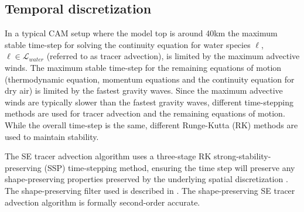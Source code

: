 \documentclass{agujournal}
\begin{document}
{%

\subsection{Temporal discretization}
In a typical CAM setup where the model top is around 40km the maximum stable time-step for solving the continuity equation for water species $\ell$, $\ell \in \mathcal{L}_{water}$ (referred to as tracer advection), is limited by the maximum advective winds. The maximum stable time-step for the remaining equations of motion (thermodynamic equation, momentum equations and the continuity equation for dry air) is limited by the fastest gravity waves.  Since the maximum advective winds are typically slower than the fastest gravity waves, different time-stepping methods are used for tracer advection and the remaining equations of motion. While the overall time-step is the same, different Runge-Kutta (RK) methods are used to maintain stability. 

The SE tracer advection algorithm uses a three-stage RK strong-stability-preserving (SSP) time-stepping method, ensuring the time step will preserve any shape-preserving properties preserved by the underlying spatial discretization \citep{SR2002SIAM}. The shape-preserving filter used is described in \citet{GTS2014JCP}. The shape-preserving SE tracer advection algorithm is formally second-order accurate.

}
\end{document}
